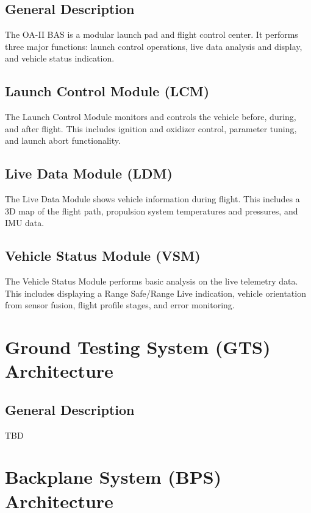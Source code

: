 \documentclass[12pt,article]{memoir}
\begin{document}
\section{General Description}
The OA-II BAS is a modular launch pad and flight control center. It performs three major functions: launch control operations, live data analysis and display, and vehicle status indication.
\section{Launch Control Module (LCM)}
The Launch Control Module monitors and controls the vehicle before, during, and after flight. This includes ignition and oxidizer control, parameter tuning, and launch abort functionality.
\section{Live Data Module (LDM)}
The Live Data Module shows vehicle information during flight. This includes a 3D map of the flight path, propulsion system temperatures and pressures, and IMU data.
\section{Vehicle Status Module (VSM)}
The Vehicle Status Module performs basic analysis on the live telemetry data. This includes displaying a Range Safe/Range Live indication, vehicle orientation from sensor fusion, flight profile stages, and error monitoring.
\newpage
\chapter{Ground Testing System (GTS) Architecture}
\section{General Description}
TBD
\newpage

\chapter{Backplane System (BPS) Architecture}
\end{document}

